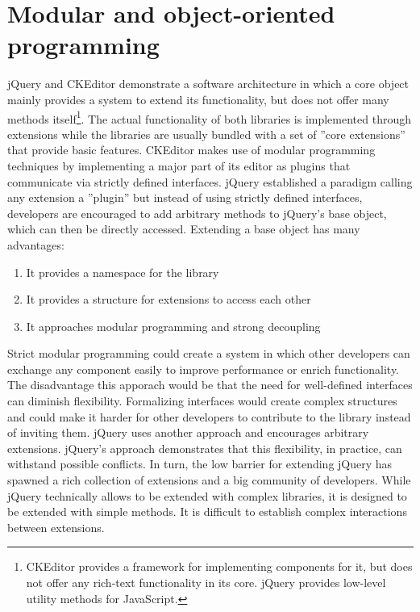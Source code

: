 \section{Modular and object-oriented programming}
\label{subsec:modular_and_oop}

jQuery and CKEditor demonstrate a software architecture in which a core object mainly provides a system to extend its functionality, but does not offer many methods itself\footnote{CKEditor provides a framework for implementing components for it, but does not offer any rich-text functionality in its core. jQuery provides low-level utility methods for JavaScript.}. The actual functionality of both libraries is implemented through extensions while the libraries are usually bundled with a set of ''core extensions'' that provide basic features. CKEditor makes use of modular programming techniques by implementing a major part of its editor as plugins that communicate via strictly defined interfaces. jQuery established a paradigm calling any extension a ''plugin'' but instead of using strictly defined interfaces, developers are encouraged to add arbitrary methods to jQuery's base object, which can then be directly accessed. Extending a base object has many advantages:

\begin{enumerate}
\item It provides a namespace for the library
\item It provides a structure for extensions to access each other
\item It approaches modular programming and strong decoupling
\end{enumerate}

Strict modular programming could create a system in which other developers can exchange any component easily to improve performance or enrich functionality. The disadvantage this apporach would be that the need for well-defined interfaces can diminish flexibility. Formalizing interfaces would create complex structures and could make it harder for other developers to contribute to the library instead of inviting them. jQuery uses another approach and encourages arbitrary extensions. jQuery's approach demonstrates that this flexibility, in practice, can withstand possible conflicts. In turn, the low barrier for extending jQuery has spawned a rich collection of extensions and a big community of developers. While jQuery technically allows to be extended with complex libraries, it is designed to be extended with simple methods. It is difficult to establish complex interactions between extensions.

